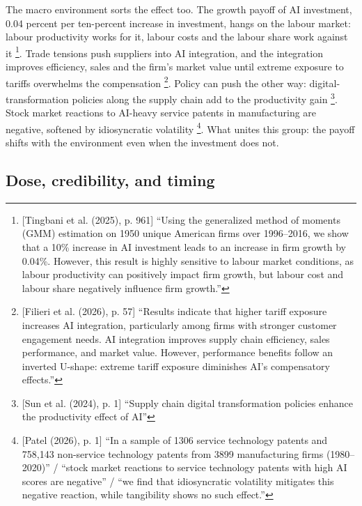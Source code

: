 The macro environment sorts the effect too. The growth payoff of AI investment, 0.04 percent per ten-percent increase in investment, hangs on the labour market: labour productivity works for it, labour costs and the labour share work against it \parencite[p.~961]{tingbani2025looking}\footnote{[Tingbani et al. (2025), p. 961] ``Using the generalized method of moments (GMM) estimation on 1950 unique American firms over 1996--2016, we show that a 10\% increase in AI investment leads to an increase in firm growth by 0.04\%. However, this result is highly sensitive to labour market conditions, as labour productivity can positively impact firm growth, but labour cost and labour share negatively influence firm growth.''}. Trade tensions push suppliers into AI integration, and the integration improves efficiency, sales and the firm's market value until extreme exposure to tariffs overwhelms the compensation \parencite[p.~57]{filieri2026engaging}\footnote{[Filieri et al. (2026), p. 57] ``Results indicate that higher tariff exposure increases AI integration, particularly among firms with stronger customer engagement needs. AI integration improves supply chain efficiency, sales performance, and market value. However, performance benefits follow an inverted U-shape: extreme tariff exposure diminishes AI's compensatory effects.''}. Policy can push the other way: digital-transformation policies along the supply chain add to the productivity gain \parencite[p.~1]{sun2024deconstruct}\footnote{[Sun et al. (2024), p. 1] ``Supply chain digital transformation policies enhance the productivity effect of AI''}. Stock market reactions to AI-heavy service patents in manufacturing are negative, softened by idiosyncratic volatility \parencite[p.~1]{patel2026navigating}\footnote{[Patel (2026), p. 1] ``In a sample of 1306 service technology patents and 758,143 non-service technology patents from 3899 manufacturing firms (1980--2020)'' / ``stock market reactions to service technology patents with high AI scores are negative'' / ``we find that idiosyncratic volatility mitigates this negative reaction, while tangibility shows no such effect.''}. What unites this group: the payoff shifts with the environment even when the investment does not.

\subsection{Dose, credibility, and timing}
\label{sec:cond-timing}

